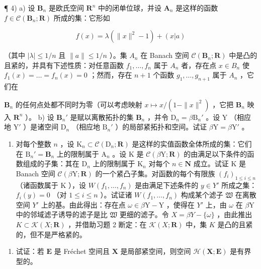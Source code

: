¶ 4) a) 设 \(\mathbf{B}_n\) 是欧氏空间 \(\mathbf{R}^n\) 中的闭单位球，并设 \(\mathbf{A}_n\) 是这样的函数 \(f \in \mathcal{C}(\mathbf{B}_n; \mathbf{R})\) 所成的集：它形如

\[
f (x) = \lambda (\| x \| ^ {2} - 1) + (x | a)
\]

（其中 \(|\lambda| \leqslant 1/n\) 且 \(\|a\| \leqslant 1/n\) ）。集 \(A_n\) 在 Banach 空间 \(\mathcal{C}(\mathbf{B}_n; \mathbf{R})\) 中是凸的且紧的，并具有下述性质：对任意函数 \(f_1, \ldots, f_n\) 属于 \(A_n\) 者，存在点 \(x \in B_n\) 使 \(f_1(x) = \ldots = f_n(x) = 0\) ；然而，存在 \(n + 1\) 个函数 \(g_1, \ldots, g_{n+1}\) 属于 \(A_n\) ，它们在

\(\mathbf{B}_n\) 的任何点处都不同时为零（可以考虑映射 \(x \mapsto x / (1 - \|x\|^2)\) ，它把 \(\mathbf{B}_n\) 映入 \(\mathbf{R}^n\) ）。 b) 设 \(\mathbf{B}_n'\) 是赋以离散拓扑的集 \(\mathbf{B}_n\) ，并令 \(\mathrm{D}_n = \beta \mathrm{B}_n'\) 。设 Y （相应地 \(\mathrm{Y}'\) ）是诸空间 \(\mathrm{D}_n\) （相应地 \(\mathrm{B}_n'\) ）的局部紧拓扑和空间。试证 \(\beta \mathrm{Y} = \beta \mathrm{Y}'\) 。

\begin{enumerate}
\def\labelenumi{\alph{enumi})}
\setcounter{enumi}{2}
\tightlist
\item
  对每个整数 \(n\) ，设 \(\mathrm{K}_n \subset \mathcal{C}(\mathrm{D}_n; \mathbf{R})\) 是这样的实值函数全体所成的集：它们在 \(\mathrm{B}_n' = \mathbf{B}_n\) 上的限制属于 \(\mathrm{A}_n\) 。设 \(\mathrm{K}\) 是 \(\mathcal{C}(\beta\mathrm{Y}; \mathbf{R})\) 的由满足以下条件的函数组成的子集：其在 \(\mathrm{D}_n\) 上的限制属于 \(\mathrm{K}_n\) 对每个 \(n \in \mathbf{N}\) 成立。试证 \(\mathrm{K}\) 是 Banach 空间 \(\mathcal{C}(\beta\mathrm{Y}; \mathbf{R})\) 的一个紧凸子集。对函数的每个有限族 \((f_i)_{1 \leqslant i \leqslant n}\) （诸函数属于 \(\mathrm{K}\) ），设 \(W(f_1, \ldots, f_n)\) 是由满足下述条件的 \(y \in Y'\) 所成之集：\(f_i(y) = 0\) （对 \(1 \leqslant i \leqslant n\) ）。试证诸 \(W(f_1, \ldots, f_n)\) 构成某个滤子 \(\mathfrak{W}\) 在离散空间 \(Y'\) 上的基。由此得出：存在点 \(\omega \in \beta\mathrm{Y} - \mathrm{Y}\) ，使得在 \(Y'\) 上，由 \(\omega\) 在 \(\beta\mathrm{Y}\) 中的邻域滤子诱导的滤子是比 \(\mathfrak{W}\) 更细的滤子。令 \(X = \beta Y - \{\omega\}\) ，由此推出 \(K \subset \mathcal{K}(X; \mathbf{R})\) ，并借助习题 2 断定：在 \(\mathcal{K}(X; \mathbf{R})\) 中，集 \(K\) 是凸的且紧的，但不是严格紧的。
\end{enumerate}

\begin{enumerate}
\def\labelenumi{\arabic{enumi})}
\setcounter{enumi}{4}
\tightlist
\item
  试证：若 \(\mathbf{E}\) 是 Fréchet 空间且 \(\mathbf{X}\) 是局部紧空间，则空间 \(\mathcal{H}(\mathbf{X};\mathbf{E})\) 是有界型的。
\end{enumerate}

